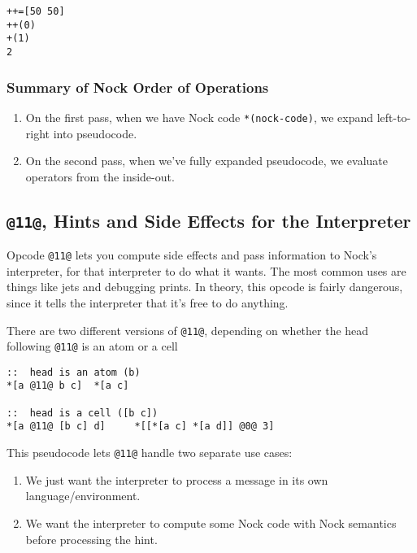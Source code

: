 \documentclass[twoside]{article}
\begin{document}
\begin{lstlisting}[style=listingcode]
++=[50 50]
++(0)
+(1)
2
\end{lstlisting}

\subsubsection{Summary of Nock Order of Operations}

\begin{enumerate}
  \item  On the first pass, when we have Nock code \lstinline[style=inlinecode]{*(nock-code)}, we expand left-to-right into pseudocode.
  \item  On the second pass, when we've fully expanded pseudocode, we evaluate operators from the inside-out.
\end{enumerate}

\subsection{\lstinline[style=inlinecode]{@11@}, Hints and Side Effects for the Interpreter}

Opcode \lstinline[style=inlinecode]{@11@} lets you compute side effects and pass information to Nock's interpreter, for that interpreter to do what it wants. The most common uses are things like jets and debugging prints. In theory, this opcode is fairly dangerous, since it tells the interpreter that it's free to do anything.

There are two different versions of \lstinline[style=inlinecode]{@11@}, depending on whether the head following \lstinline[style=inlinecode]{@11@} is an atom or a cell

\begin{lstlisting}[style=listingcode]
::  head is an atom (b)
*[a @11@ b c]  *[a c]

::  head is a cell ([b c])
*[a @11@ [b c] d]     *[[*[a c] *[a d]] @0@ 3]
\end{lstlisting}

This pseudocode lets \lstinline[style=inlinecode]{@11@} handle two separate use cases:

\begin{enumerate}
  \item  We just want the interpreter to process a message in its own language/environment.
  \item  We want the interpreter to compute some Nock code with Nock semantics before processing the hint.
\end{enumerate}
\end{document}
